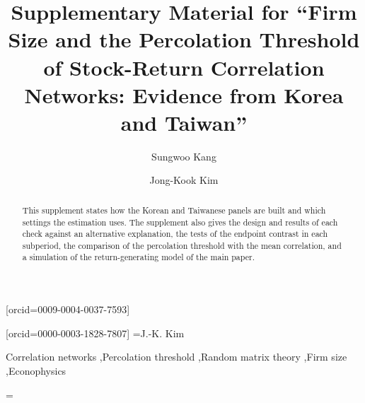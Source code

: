 \documentclass[a4paper,fleqn]{cas-sc}
\makeatletter
\def\eadname#1{\@eadauthor={#1}}
\makeatother
\begin{document}
\let\WriteBookmarks\relax


\title[mode=title]{Supplementary Material for ``Firm Size and the Percolation Threshold of Stock-Return Correlation Networks: Evidence from Korea and Taiwan''}

\author[1]{Sungwoo Kang}[orcid=0009-0004-0037-7593]

\author[2]{Jong-Kook Kim}[orcid=0000-0003-1828-7807]
\cormark[1]
\eadname{J.-K. Kim} %




\begin{abstract}
This supplement states how the Korean and Taiwanese panels are built and which settings the estimation uses. The supplement also gives the design and results of each check against an alternative explanation, the tests of the endpoint contrast in each subperiod, the comparison of the percolation threshold with the mean correlation, and a simulation of the return-generating model of the main paper.
\end{abstract}

\begin{keywords}
Correlation networks \sep Percolation threshold \sep Random matrix theory \sep Firm size \sep Econophysics
\end{keywords}

{\hfuzz=\maxdimen \maketitle}
\end{document}
